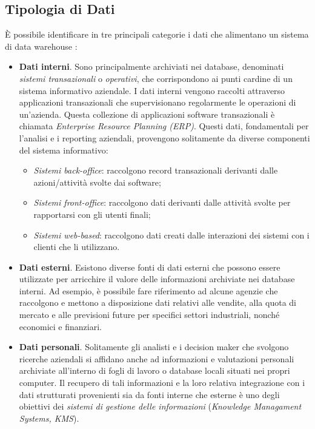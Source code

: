\subsection{Tipologia di Dati}

È possibile identificare in tre principali categorie i dati che alimentano un sistema di data warehouse \cite{vercellis_business_intelligence}:
\begin{itemize}
    \item \textbf{Dati interni}. Sono principalmente archiviati nei database, denominati \textit{sistemi transazionali} o \textit{operativi}, che corrispondono ai punti cardine di un sistema informativo aziendale. I dati interni vengono raccolti attraverso applicazioni transazionali che supervisionano regolarmente le operazioni di un'azienda. Questa collezione di applicazioni software transazionali è chiamata \textit{Enterprise Resource Planning (ERP)}. Questi dati, fondamentali per l'analisi e i reporting aziendali, provengono solitamente da diverse componenti del sistema informativo:
        \begin{itemize}
            \item \textit{Sistemi back-office}: raccolgono record transazionali derivanti dalle azioni/attività svolte dai software;
            \item \textit{Sistemi front-office}: raccolgono dati derivanti dalle attività svolte per rapportarsi con gli utenti finali;
            \item \textit{Sistemi web-based}: raccolgono dati creati dalle interazioni dei sistemi con i clienti che li utilizzano.
        \end{itemize}
    \item \textbf{Dati esterni}. Esistono diverse fonti di dati esterni che possono essere utilizzate per arricchire il valore delle informazioni archiviate nei database interni. Ad esempio, è possibile fare riferimento ad alcune agenzie che raccolgono e mettono a disposizione dati relativi alle vendite, alla quota di mercato e alle previsioni future per specifici settori industriali, nonché economici e finanziari. 
    \item \textbf{Dati personali}. Solitamente gli analisti e i decision maker che svolgono ricerche aziendali si affidano anche ad informazioni e valutazioni personali archiviate all'interno di fogli di lavoro o database locali situati nei propri computer. Il recupero di tali informazioni e la loro relativa integrazione con i dati strutturati provenienti sia da fonti interne che esterne è uno degli obiettivi dei \textit{sistemi di gestione delle informazioni} (\textit{Knowledge Managament Systems, KMS}).
\end{itemize}

